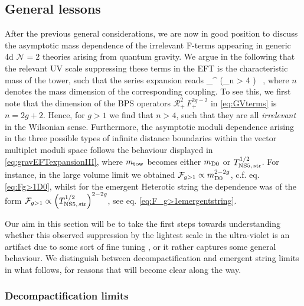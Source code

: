 \subsection{General lessons}
\label{ss:gravEFTexpansion}

After the previous general considerations, we are now in good position to discuss the asymptotic mass dependence of the irrelevant F-terms appearing in generic 4d $\mathcal{N}=2$ theories arising from quantum gravity. We argue in the following that the relevant UV scale suppressing these terms in the EFT is the characteristic mass of the tower, such that the series expansion reads
%
\beq
{}_{}^{} \supset {} \left(\sum_{n > 4}  \right) \, ,
\label{eq:gravEFTexpansionIII}
\eeq
%
where $n$ denotes the mass dimension of the corresponding coupling. To see this, we first note that the dimension of the BPS operators $\mathcal{R}_+^2\, F_+^{2g-2}$ in \eqref{eq:GVterms} is $n=2g+2$. Hence, for $g>1$ we find that $n > 4$, such that they are all \emph{irrelevant} in the Wilsonian sense. Furthermore, the asymptotic moduli dependence arising in the three possible types of infinite distance boundaries within the vector multiplet moduli space follows the behaviour displayed in \eqref{eq:gravEFTexpansionIII}, where $m_{\rm tow}$ becomes either $m_{\rm D0}$ or $T_{\rm NS5,\, str}^{1/2}$. For instance, in the large volume limit we obtained $\mathcal{F}_{g>1} \propto m_{\rm D0}^{2-2g}$, c.f. eq. \eqref{eq:Fg>1D0}, whilst for the emergent Heterotic string the dependence was of the form $\mathcal{F}_{g>1} \propto \left(T_{\rm NS5,\, str}^{1/2} \right)^{2-2g}$, see eq. \eqref{eq:F_g>1emergentstring}.

Our aim in this section will be to take the first steps towards understanding whether this observed suppression by the lightest scale in the ultra-violet is an artifact due to some sort of fine tuning \cite{Heckman:2019bzm}, or it rather captures some general behaviour. We distinguish between decompactification and emergent string limits in what follows, for reasons that will become clear along the way.

\subsubsection*{Decompactification limits}

